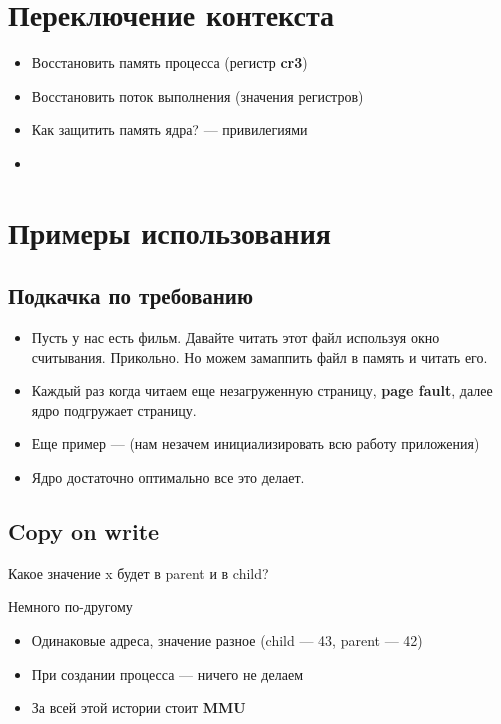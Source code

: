 \documentclass[../../lectures.tex]{subfiles}
\begin{document}
\section{Переключение контекста}
\begin{itemize}
    \item Восстановить память процесса (регистр \textbf{cr3})
    \item Восстановить поток выполнения (значения регистров)
    \item Как защитить память ядра? --- привилегиями
    \item {}
\end{itemize}

\section{Примеры использования}
\subsection{Подкачка по требованию}
\begin{itemize}
    \item Пусть у нас есть фильм. Давайте читать этот файл используя
          окно считывания. Прикольно. Но можем замаппить файл в память 
          и читать его.
    \item Каждый раз когда читаем еще незагруженную страницу, \textbf{page fault},
          далее ядро подгружает страницу.
    \item Еще пример ---  (нам незачем инициализировать всю работу приложения)
    \item Ядро достаточно оптимально все это делает.
\end{itemize}
\subsection{Copy on write}
Какое значение x будет в parent и в child?

Немного по-другому
\begin{itemize}
    \item Одинаковые адреса, значение разное (child --- 43, parent --- 42)
    \item При создании процесса --- ничего не делаем
    \item За всей этой истории стоит \textbf{MMU}
\end{itemize}
\end{document}
